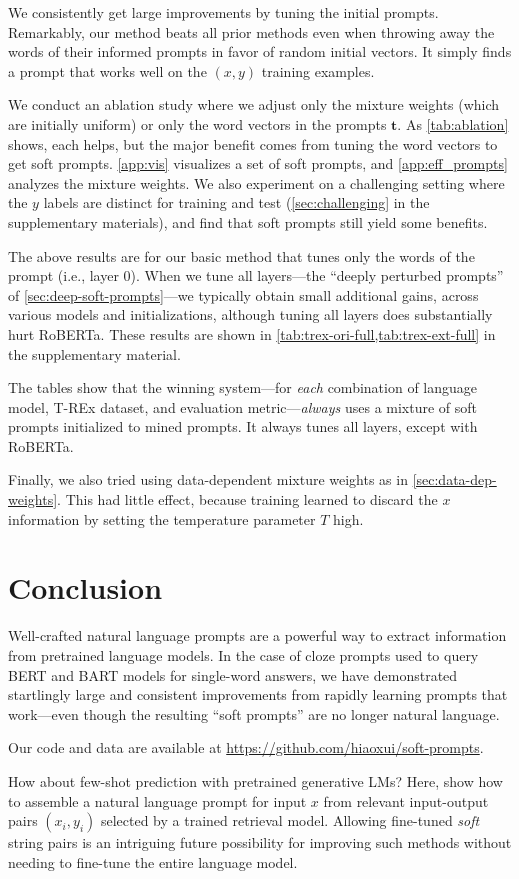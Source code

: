 We consistently get large improvements by tuning the initial prompts.  Remarkably, our method beats all prior methods even when throwing away the words of their informed prompts in favor of random initial vectors.  It simply finds a prompt that works well on the $(x,y)$ training examples.

We conduct an ablation study where we adjust only the mixture weights (which are initially uniform) or only the word vectors in the prompts $\mathbf{t}$. As \ref{tab:ablation} shows, each helps, but the major benefit comes from tuning the word vectors to get soft prompts.  \ref{app:vis} visualizes a set of soft prompts, and \ref{app:eff_prompts} analyzes the mixture weights. We also experiment on a challenging setting where the $y$ labels are distinct for training and test (\ref{sec:challenging} in the supplementary materials), and find that soft prompts still yield some benefits.

The above results are for our basic method that tunes only the words of the prompt (i.e., layer 0).  When we tune all layers---the ``deeply perturbed prompts'' of \ref{sec:deep-soft-prompts}---we typically obtain small additional gains, across various models and initializations, although tuning all layers does substantially hurt RoBERTa. These results are shown in \ref{tab:trex-ori-full,tab:trex-ext-full} in the supplementary material.

The tables show that the winning system---for \emph{each} combination of language model, T-REx dataset, and evaluation metric---\emph{always} uses a mixture of soft prompts initialized to mined prompts.  It always tunes all layers, except with RoBERTa.

Finally, we also tried using data-dependent mixture weights as in \ref{sec:data-dep-weights}.  This had little effect, because training learned to discard the $x$ information by setting the temperature parameter $T$ high.

\section{Conclusion}

Well-crafted natural language prompts are a powerful way to extract information from pretrained language models.  In the case of cloze prompts used to query BERT and BART models for single-word answers, we have demonstrated startlingly large and consistent improvements from rapidly learning prompts that work---even though the resulting ``soft prompts'' are no longer natural language.  

Our code and data are available at \url{https://github.com/hiaoxui/soft-prompts}.

How about few-shot prediction with pretrained generative LMs? Here, \citet{lewis2020etrievalaugmented} show how to assemble a natural language prompt for input $x$ from relevant input-output pairs $(x_i,y_i)$ selected by a trained retrieval model.  Allowing fine-tuned \emph{soft} string pairs is an intriguing future possibility for improving such methods without needing to fine-tune the entire language model.


